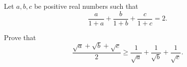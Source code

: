 Let $a, b, c$ be positive real numbers such that\[\frac{a}{1+a}+\frac{b}{1+b}+\frac{c}{1+c}=2.\]

Prove that\[\frac{\sqrt a + \sqrt b+\sqrt c}{2} \geq \frac{1}{\sqrt a}+\frac{1}{\sqrt b}+\frac{1}{\sqrt c}.\]